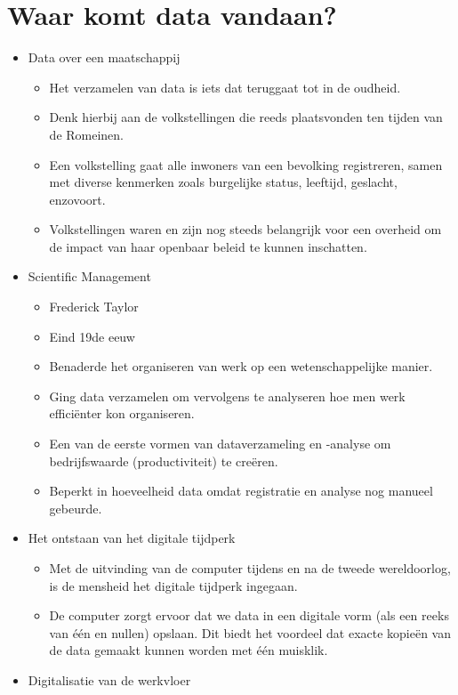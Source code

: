 \documentclass[]{memoir}
\providecommand{\tightlist}{%
  \setlength{\itemsep}{0pt}\setlength{\parskip}{0pt}}
\begin{document}
\hypertarget{waar-komt-data-vandaan}{%
\section{Waar komt data vandaan?}\label{waar-komt-data-vandaan}}

\begin{itemize}
\tightlist
\item
  Data over een maatschappij

  \begin{itemize}
  \tightlist
  \item
    Het verzamelen van data is iets dat teruggaat tot in de oudheid.
  \item
    Denk hierbij aan de volkstellingen die reeds plaatsvonden ten tijden van de Romeinen.
  \item
    Een volkstelling gaat alle inwoners van een bevolking registreren, samen met diverse kenmerken zoals burgelijke status, leeftijd, geslacht, enzovoort.
  \item
    Volkstellingen waren en zijn nog steeds belangrijk voor een overheid om de impact van haar openbaar beleid te kunnen inschatten.
  \end{itemize}
\item
  Scientific Management

  \begin{itemize}
  \tightlist
  \item
    Frederick Taylor
  \item
    Eind 19de eeuw
  \item
    Benaderde het organiseren van werk op een wetenschappelijke manier.
  \item
    Ging data verzamelen om vervolgens te analyseren hoe men werk efficiënter kon organiseren.
  \item
    Een van de eerste vormen van dataverzameling en -analyse om bedrijfswaarde (productiviteit) te creëren.
  \item
    Beperkt in hoeveelheid data omdat registratie en analyse nog manueel gebeurde.
  \end{itemize}
\item
  Het ontstaan van het digitale tijdperk

  \begin{itemize}
  \tightlist
  \item
    Met de uitvinding van de computer tijdens en na de tweede wereldoorlog, is de mensheid het digitale tijdperk ingegaan.
  \item
    De computer zorgt ervoor dat we data in een digitale vorm (als een reeks van één en nullen) opslaan. Dit biedt het voordeel dat exacte kopieën van de data gemaakt kunnen worden met één muisklik.
  \end{itemize}
\item
  Digitalisatie van de werkvloer


\end{itemize}
\end{document}
